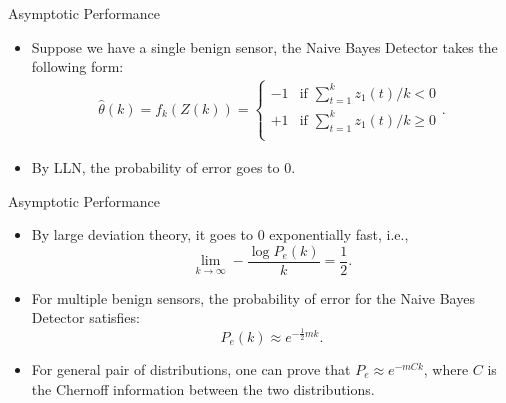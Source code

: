 \documentclass[10pt]{beamer}
\newlength\figureheight
\newlength\figurewidth
\newcommand{\tikzdir}[1]{#1.tikz}
\newcommand{\inputtikz}[1]{}}
\begin{document}
\begin{frame}{Asymptotic Performance}
  \begin{itemize}
    \item Suppose we have a single benign sensor, the Naive Bayes Detector takes the following form:
      \begin{align*}
	\hat \theta(k)=f_k(Z(k))=\begin{cases}
	  -1 &\text{if }\sum_{t=1}^k z_1(t)/k < 0\\
	  +1 &\text{if }\sum_{t=1}^k z_1(t)/k \geq 0\\
	\end{cases}.
      \end{align*}
    \item By LLN, the probability of error goes to $0$.
  \end{itemize}

  \begin{center}
    \setlength{\figureheight}{3cm}
    \setlength{\figurewidth}{10cm}
   {\inputtikz{gaussian3}}
   {\inputtikz{gaussian2}}
  \end{center}
\end{frame}

\begin{frame}{Asymptotic Performance}
  \begin{itemize}
    \item By large deviation theory, it goes to $0$ exponentially fast, i.e.,
      \begin{displaymath}
	\lim_{k\rightarrow\infty}-\frac{\log P_e(k)}{k}= \frac{1}{2}.
      \end{displaymath}
    \item For multiple benign sensors, the probability of error for the Naive Bayes Detector satisfies:
      \begin{displaymath}
	P_e(k)\approx e^{-\frac{1}{2}mk}.
      \end{displaymath}
    \item For general pair of distributions, one can prove that $P_e \approx e^{-mCk}$, where $C$ is the Chernoff information between the two distributions.
  \end{itemize}
\end{frame}
\end{document}

